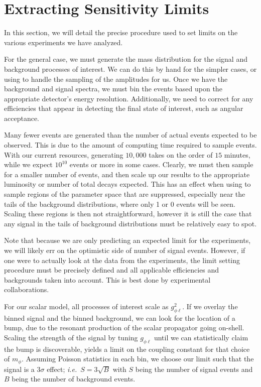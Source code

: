 \section{Extracting Sensitivity Limits}
\label{sec:limit_procedure}
In this section, we will detail the precise procedure used to set limits on the various experiments we have analyzed.

For the general case, we must generate the mass distribution for the signal and background processes of interest.
We can do this by hand for the simpler cases, or using \madgraph to handle the sampling of the amplitudes for us.
Once we have the background and signal spectra, we must bin the events based upon the appropriate detector's energy resolution.
Additionally, we need to correct for any efficiencies that appear in detecting the final state of interest, such as angular acceptance.

Many fewer events are generated than the number of actual events expected to be observed.
This is due to the amount of computing time required to sample events.
With our current resources, generating $10,000$ takes on the order of $15$ minutes, while we expect $10^{10}$ events or more in some cases.
Clearly, we must then sample for a smaller number of events, and then scale up our results to the appropriate luminosity or number of total decays expected.
This has an effect when using \madgraph to sample regions of the parameter space that are suppressed, especially near the tails of the background distributions, where only 1 or 0 events will be seen.
Scaling these regions is then not straightforward, however it is still the case that any signal in the tails of background distributions must be relatively easy to spot.

Note that because we are only predicting an expected limit for the experiments, we will likely err on the optimistic side of number of signal events.
However, if one were to actually look at the data from the experiments, the limit setting procedure must be precisely defined and all applicable efficiencies and backgrounds taken into account.
This is best done by experimental collaborations.

For our scalar model, all processes of interest scale as $g_{\phi\ell}^2$.
If we overlay the binned signal and the binned background, we can look for the location of a bump, due to the resonant production of the scalar propagator going on-shell.
Scaling the strength of the signal by tuning $g_{\phi\ell}$ until we can statistically claim the bump is discoverable, yields a limit on the coupling constant for that choice of $m_\phi$.
Assuming Poisson statistics in each bin, we choose our limit such that the signal is a $3\sigma$ effect; {\em i.e.}\ $S = 3\sqrt{B}$ with $S$ being the number of signal events and $B$ being the number of background events.

